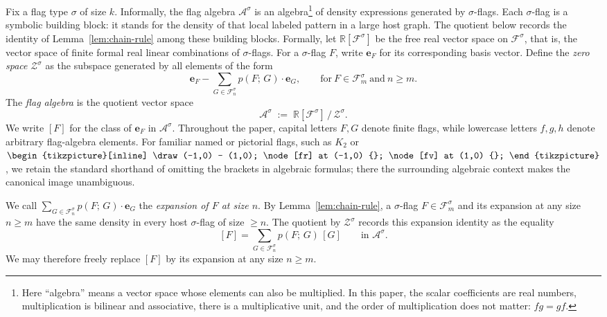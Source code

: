 \documentclass{article}
\newcommand{\den}[2]{p(#1;\,#2)}
\newcommand{\fKtwobull}{%
  \begin{tikzpicture}[inline]
    \draw (-1,0) -- (1,0);
    \node[fr] at (-1,0) {};
    \node[fv] at (1,0) {};
  \end{tikzpicture}%
}
\begin{document}
Fix a flag type $\sigma$ of size $k$.
Informally, the flag algebra $\mathcal{A}^\sigma$ is an algebra\footnote{Here
``algebra'' means a vector space whose elements can also be multiplied.  In
this paper, the scalar coefficients are real numbers, multiplication is
bilinear and associative, there is a multiplicative unit, and the order of
multiplication does not matter: $fg=gf$.} of density expressions generated
by $\sigma$-flags.  Each $\sigma$-flag is a symbolic building block: it stands for the
density of that local labeled pattern in a large host graph.  The quotient
below records the identity of Lemma~\ref{lem:chain-rule} among these building
blocks.
Formally, let
$\mathbb{R}[\mathcal{F}^\sigma]$ be the free real vector space on
$\mathcal{F}^\sigma$, that is, the vector space of finite formal real linear
combinations of $\sigma$-flags.  For a $\sigma$-flag $F$, write $\mathbf e_F$
for its corresponding basis vector.
Define the \emph{zero space} $\mathcal{Z}^\sigma$ as the subspace generated
by all elements of the form
\begin{equation}
  \label{eq:zero-element}
  \mathbf e_F - \sum_{G \in \mathcal{F}^\sigma_n} \den{F}{G} \cdot \mathbf e_G,
  \qquad \text{for}\ F \in \mathcal{F}^\sigma_m \ \text{and}\ n \geq m.
\end{equation}
The \emph{flag algebra} is the quotient vector space
\[
  \mathcal{A}^\sigma \;:=\; \mathbb{R}[\mathcal{F}^\sigma] \,/\, \mathcal{Z}^\sigma.
\]
We write $[F]$ for the class of $\mathbf e_F$ in $\mathcal{A}^\sigma$.
Throughout the paper, capital letters $F,G$ denote finite flags, while
lowercase letters $f,g,h$ denote arbitrary flag-algebra elements.
For familiar named or pictorial flags, such as $K_2$ or
$\fKtwobull$, we retain the standard shorthand of omitting the brackets in
algebraic formulas; there the surrounding algebraic context makes the
canonical image unambiguous.

We call $\sum_{G \in \mathcal{F}^\sigma_n} \den{F}{G} \cdot \mathbf e_G$ the
\emph{expansion of $F$ at size $n$}.
By Lemma~\ref{lem:chain-rule}, a $\sigma$-flag $F \in \mathcal{F}^\sigma_m$ and
its expansion at any size $n \geq m$ have the same density in every host
$\sigma$-flag of size $\geq n$.
The quotient by $\mathcal{Z}^\sigma$ records this expansion identity as the
equality
\begin{equation}
  \label{eq:expansion-identity}
  [F]
  =
  \sum_{G \in \mathcal{F}^\sigma_n} \den{F}{G}\,[G]
  \qquad\text{in }\mathcal{A}^\sigma .
\end{equation}
We may therefore freely replace $[F]$ by its expansion at any size $n \geq m$.
\end{document}
